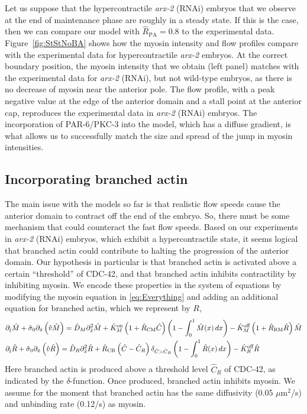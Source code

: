 \documentclass[11pt]{article}
\newcommand{\red}[1]{\color{red}#1\normalcolor}
\newcommand{\6}[1]{#1_{\text{6}}}
\newcommand{\3}[1]{#1_{\text{3}}}
\begin{document}
Let us suppose that the hypercontractile \emph{arx-2} (RNAi) embryos that we observe at the end of maintenance phase are roughly in a steady state. If this is the case, then we can compare our model with $\hat R_\text{PA}=0.8$ to the experimental data. Figure\ \ref{fig:StStNoBA} shows how the myosin intensity and flow profiles compare with the experimental data for hypercontractile \emph{arx-2} embryos. At the correct boundary position, the myosin intensity that we obtain (left panel) matches with the experimental data for \emph{arx-2} (RNAi), but not wild-type embryos, as there is no decrease of myosin near the anterior pole. The flow profile, with a peak negative value at the edge of the anterior domain and a stall point at the anterior cap, reproduces the experimental data in \emph{arx-2} (RNAi) embryos. The incorporation of PAR-6/PKC-3 into the model, which has a diffuse gradient, is what allows us to successfully match the size and spread of the jump in myosin intensities.


\subsection{Incorporating branched actin}
The main issue with the models so far is that realistic flow speeds cause the anterior domain to contract off the end of the embryo. So, there must be some mechanism that could counteract the fast flow speeds. Based on our experiments in \emph{arx-2} (RNAi) embryos, which exhibit a hypercontractile state, it seems logical that branched actin could contribute to halting the progression of the anterior domain. Our hypothesis in particular is that branched actin is activated above a certain ``threshold'' of CDC-42, and that branched actin inhibits contractility by inhibiting myosin. We encode these properties in the system of equations by modifying the myosin equation in \eqref{eq:Everything} and adding an additional equation for branched actin, which we represent by $R$,  
\begin{align}
\nonumber
&\partial_{\hat{t}} \hat{M} +\hat{\sigma}_0  \partial_{\hat{x}} \left(\hat{v} \hat{M} \right) =\hat{D}_M \partial_{\hat{x}}^2 \hat{M} +\hat{K}^\text{on}_M \left(1+\hat{R}_\text{CM} \hat C\right) \left(1-\int_0^1  \hat{M}(x) \, dx\right)- \hat{K}^\text{off}_M \left(1+\hat R_\text{RM} \hat R\right) \hat{M}\\
\label{eq:BAll}
&\partial_{\hat{t}} \hat{R} +\hat{\sigma}_0  \partial_{\hat{x}} \left(\hat{v} \hat{R} \right) =\hat{D}_R \partial_{\hat{x}}^2 \hat{R} +\hat R_\text{CR} \left(\hat C-\hat C_R\right) {\delta}_{\hat C > \hat C_R} \left(1-\int_0^1  \hat{R}(x) \, dx\right)- \hat{K}^\text{off}_R \hat{R}
\end{align}
Here branched actin is produced above a threshold level $\hat C_R$ of CDC-42, as indicated by the $\delta$-function. Once produced, branched actin inhibits myosin. \red{We assume for the moment that branched actin has the same diffusivity (0.05 $\mu$m$^2$/s) and unbinding rate (0.12/s) as myosin.}
\end{document}
